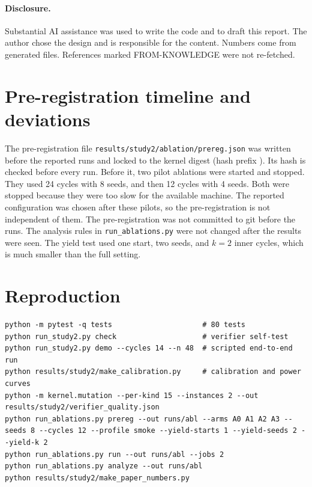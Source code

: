 \documentclass[11pt]{article}
\begin{document}
\paragraph{Disclosure.} Substantial AI assistance was used to write the code and to draft this report. The author chose the design and is responsible for the content. Numbers come from generated files. References marked FROM-KNOWLEDGE were not re-fetched.




\appendix
\section{Pre-registration timeline and deviations}
\label{app:prereg}

The pre-registration file \texttt{results/study2/ablation/prereg.json} was written before the reported runs and locked to the kernel digest (hash prefix \PreregHash). Its hash is checked before every run.
Before it, two pilot ablations were started and stopped. They used 24 cycles with 8 seeds, and then 12 cycles with 4 seeds. Both were stopped because they were too slow for the available machine. The reported configuration was chosen after these pilots, so the pre-registration is not independent of them.
The pre-registration was not committed to git before the runs. The analysis rules in \texttt{run\_ablations.py} were not changed after the results were seen. The yield test used one start, two seeds, and $k=2$ inner cycles, which is much smaller than the full setting.

\section{Reproduction}
\label{app:repro}

\begin{verbatim}
python -m pytest -q tests                     # 80 tests
python run_study2.py check                    # verifier self-test
python run_study2.py demo --cycles 14 --n 48  # scripted end-to-end run
python results/study2/make_calibration.py     # calibration and power curves
python -m kernel.mutation --per-kind 15 --instances 2 --out results/study2/verifier_quality.json
python run_ablations.py prereg --out runs/abl --arms A0 A1 A2 A3 --seeds 8 --cycles 12 --profile smoke --yield-starts 1 --yield-seeds 2 --yield-k 2
python run_ablations.py run --out runs/abl --jobs 2
python run_ablations.py analyze --out runs/abl
python results/study2/make_paper_numbers.py
\end{verbatim}
\end{document}
